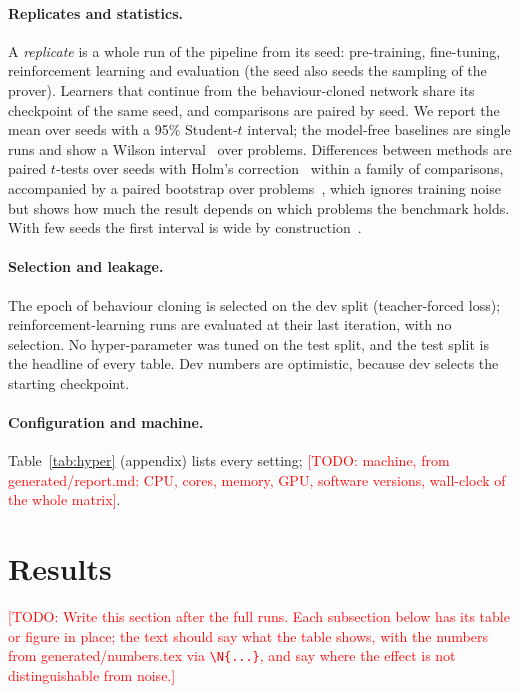 \documentclass[10pt]{article}
\newcommand{\todo}[1]{\textcolor{red}{[TODO: #1]}}                                                    %
\begin{document}
\paragraph{Replicates and statistics.}
A \emph{replicate} is a whole run of the pipeline from its seed: pre-training, fine-tuning, reinforcement learning and evaluation (the seed also seeds the sampling of the prover). Learners that continue from the behaviour-cloned network share its checkpoint of the same seed, and comparisons are paired by seed.
We report the mean over seeds with a 95\% Student-$t$ interval; the model-free baselines are single runs and show a Wilson interval~\citep{wilson1927probable} over problems. Differences between methods are paired $t$-tests over seeds with Holm's correction~\citep{holm1979simple} within a family of comparisons, accompanied by a paired bootstrap over problems~\citep{efron1979bootstrap}, which ignores training noise but shows how much the result depends on which problems the benchmark holds. With few seeds the first interval is wide by construction~\citep{henderson2018deep,agarwal2021deep}.

\paragraph{Selection and leakage.}
The epoch of behaviour cloning is selected on the dev split (teacher-forced loss); reinforcement-learning runs are evaluated at their last iteration, with no selection. No hyper-parameter was tuned on the test split, and the test split is the headline of every table. Dev numbers are optimistic, because dev selects the starting checkpoint.

\paragraph{Configuration and machine.}
Table~\ref{tab:hyper} (appendix) lists every setting; \todo{machine, from generated/report.md: CPU, cores, memory, GPU, software versions, wall-clock of the whole matrix}.

\section{Results}\label{sec:results}

\todo{Write this section after the full runs. Each subsection below has its table or figure in place; the text should say what the table shows, with the numbers from generated/numbers.tex via \texttt{\textbackslash N\{...\}}, and say where the effect is not distinguishable from noise.}
\end{document}
